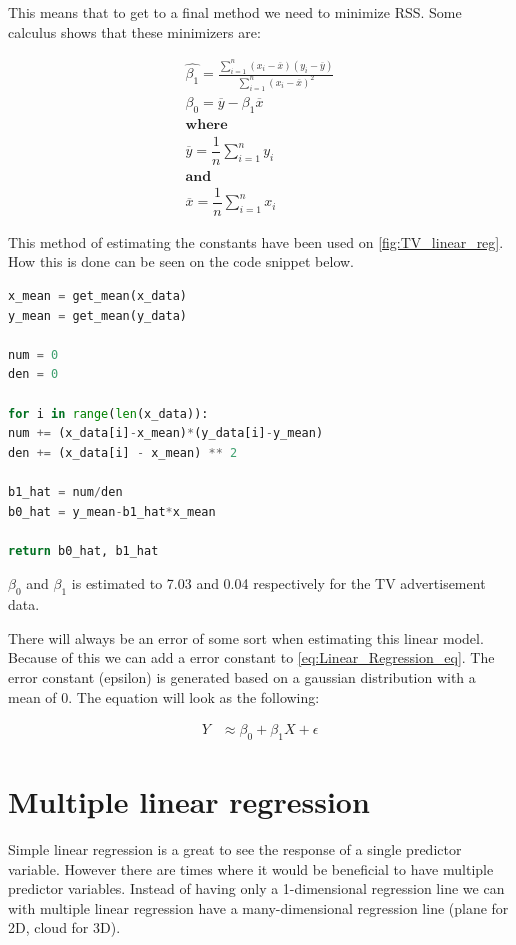 This means that to get to a final method we need to minimize RSS. Some calculus shows that these minimizers are:

\begin{equation} \label{eq:RSS_e}
\begin{split}
\hat{\beta_1}=\frac{\sum_{i=1}^{n}(x_{i}-\overline{x})(y_{i}-\overline{y})}{\sum_{i=1}^{n}(x_{i}-\overline{x})^{2}} \\
\beta_0=\overline{y}-\beta_1\overline{x} \\
\textbf{where} \\
\overline{y}=\dfrac{1}{n}\sum_{i=1}^{n}y_{i} \\
\textbf{and} \\
\overline{x}=\dfrac{1}{n}\sum_{i=1}^{n}x_{i} 
\end{split}
\end{equation} 

This method of estimating the constants have been used on \cref*{fig:TV_linear_reg}. How this is done can be seen on the code snippet below.


\begin{lstlisting}[language=Python]
x_mean = get_mean(x_data)
y_mean = get_mean(y_data)

num = 0
den = 0

for i in range(len(x_data)):
num += (x_data[i]-x_mean)*(y_data[i]-y_mean)
den += (x_data[i] - x_mean) ** 2

b1_hat = num/den
b0_hat = y_mean-b1_hat*x_mean

return b0_hat, b1_hat
\end{lstlisting}

$\beta_0$ and $\beta_1$ is estimated to 7.03 and 0.04 respectively for the TV advertisement data.

There will always be an error of some sort when estimating this linear model. Because of this we can add a error constant to \cref{eq:Linear_Regression_eq}. The error constant (epsilon) is generated based on a gaussian distribution with a mean of 0. The equation will look as the following:

\begin{equation} \label{eq:linear_reg_e}
\begin{split}
Y & \approx \beta_0 + \beta_1 X + \epsilon
\end{split}
\end{equation} 

\section{Multiple linear regression}
Simple linear regression is a great to see the response of a single predictor variable. However there are times where it would be beneficial to have multiple predictor variables. Instead of having only a 1-dimensional regression line we can with multiple linear regression have a many-dimensional regression line (plane for 2D, cloud for 3D).

